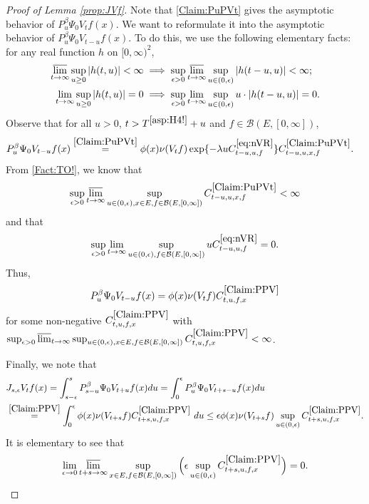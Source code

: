 \documentclass[12pt,a4paper]{amsart}
\numberwithin{equation}{section}
\theoremstyle{plain}
\theoremstyle{definition}
\theoremstyle{remark}
\begin{document}
\begin{proof}[Proof of Lemma \ref{prop:JVf}]
	Note that \eqref{Claim:PuPVt} gives the asymptotic behavior of $P_u^\beta \Psi_0 V_t f(x)$.
	We want to reformulate it into the asymptotic behavior  of $P_u^\beta \Psi_0 V_{t-u} f(x)$.	
	To do this, we use the following elementary facts: for any real function $h$ on $[0,\infty)^2$,
	\begin{align}\label{Fact:TO!}
	\varlimsup_{t\to \infty} \sup_{u\geq 0} |h(t,u)| < \infty & \implies \sup_{\epsilon > 0} \varlimsup_{t\to \infty} \sup_{u \in (0,\epsilon)} |h(t-u,u)| < \infty;
	\\ 	\lim_{t\to \infty} \sup_{u \geq 0} |h(t,u)| = 0 & \implies \sup_{\epsilon > 0} \lim_{t\to \infty} \sup_{u \in (0,\epsilon)} u\cdot |h(t-u,u)| = 0.
	\end{align}
	Observe that for all $u>0$, $t> T^{\eqref{asp:H4!}} + u$ and $f \in \mathcal B(E,[0,\infty])$,
	\begin{align}
	& P_u^\beta \Psi_0 V_{t-u} f(x)
	\overset{\eqref{Claim:PuPVt}}= \phi(x) \nu(V_{t}f) \exp\{-\lambda u C^{\eqref{eq:nVR}}_{t-u,u,f} \} C^{\eqref{Claim:PuPVt}}_{t-u,u,x,f}.
	\end{align}
	From \eqref{Fact:TO!}, we know that
	\[
	\sup_{\epsilon > 0}\varlimsup_{t\to \infty}
	\sup_{u\in (0,\epsilon), x\in E, f \in \mathcal B(E,[0,\infty])}
	C^{\eqref{Claim:PuPVt}}_{t-u,u,x,f} < \infty
	\]
	and that
	\[
	\sup_{\epsilon > 0}\lim_{t\to \infty}
	\sup_{u\in (0,\epsilon), f \in \mathcal B(E,[0,\infty])}
	uC^{\eqref{eq:nVR}}_{t-u,u,f} =0.
	\]
	Thus,
\begin{equation}
	\label{Claim:PPV}
	P_u^\beta \Psi_0 V_{t-u} f(x) = \phi(x)\nu(V_tf) C^{\eqref{Claim:PPV}}_{t,u,f,x}
\end{equation}
	for some non-negative $C^{\eqref{Claim:PPV}}_{t, u,f,x}$ with
	$\sup_{\epsilon > 0} \varlimsup_{t\to \infty}
	\sup_{u \in (0,\epsilon), x\in E, f \in \mathcal B(E,[0,\infty])}
	C^{\eqref{Claim:PPV}}_{t,u,f,x} < \infty$.

	Finally, we note that
	\begin{align}
	&J_{s,\epsilon}V_tf(x) = \int_{s-\epsilon}^s P_{s-u}^\beta \Psi_0 V_{t+u} f(x)du
	= \int_0^\epsilon P_u^\beta \Psi_0 V_{t+s - u}f(x) du
	\\& \overset{\eqref{Claim:PPV}}= \int_0^\epsilon \phi(x) \nu(V_{t+s}f) C^{\eqref{Claim:PPV}}_{t+s,u,f,x}~du
	\leq \epsilon \phi(x)\nu(V_{t+s}f) \sup_{u\in (0,\epsilon)} C^{\eqref{Claim:PPV}}_{t+s,u,f,x}.
	\end{align}
	It is elementary to see that \[\lim_{\epsilon \to 0}\varlimsup_{t+s \to \infty}
	\sup_{x\in E, f \in \mathcal B(E,[0,\infty])}
	\Big(\epsilon \sup_{u\in (0,\epsilon)} C^{\eqref{Claim:PPV}}_{t+s,u,f,x}\Big) = 0.\qedhere\]
\end{proof}
\end{document}

